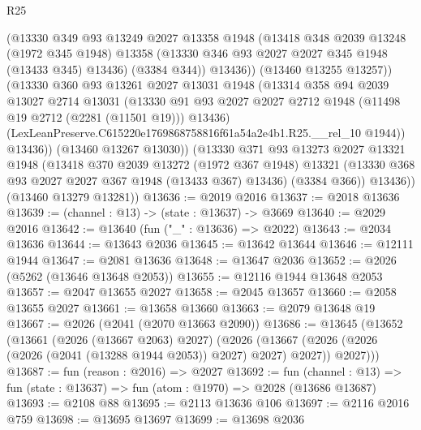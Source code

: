 \begin{lexlean}{R25}
\begin{coremodule}
                (@13330
                  @349
                  @93
                  @13249
                  @2027
                  @13358
                  @1948
                  (@13418
                    @348
                    @2039
                    @13248
                    (@1972 @345 @1948)
                    @13358
                    (@13330 @346 @93 @2027 @2027 @345 @1948 (@13433 @345) @13436)
                    (@3384 @344))
                  @13436))
              (@13460 @13255 @13257))
            (@13330
              @360
              @93
              @13261
              @2027
              @13031
              @1948
              (@13314
                @358
                @94
                @2039
                @13027
                @2714
                @13031
                (@13330
                  @91
                  @93
                  @2027
                  @2027
                  @2712
                  @1948
                  (@11498 @19 @2712 (@2281 (@11501 @19)))
                  @13436)
                (LexLeanPreserve.C615220e1769868758816f61a54a2e4b1.R25.__rel_10 @1944))
              @13436))
          (@13460 @13267 @13030))
        (@13330
          @371
          @93
          @13273
          @2027
          @13321
          @1948
          (@13418
            @370
            @2039
            @13272
            (@1972 @367 @1948)
            @13321
            (@13330 @368 @93 @2027 @2027 @367 @1948 (@13433 @367) @13436)
            (@3384 @366))
          @13436))
      (@13460 @13279 @13281))
@13636 := @2019 @2016
@13637 := @2018 @13636
@13639 := (channel : @13) -> (state : @13637) -> @3669
@13640 := @2029 @2016
@13642 := @13640 (fun ("_" : @13636) => @2022)
@13643 := @2034 @13636
@13644 := @13643 @2036
@13645 := @13642 @13644
@13646 := @12111 @1944
@13647 := @2081 @13636
@13648 := @13647 @2036
@13652 := @2026 (@5262 (@13646 @13648 @2053))
@13655 := @12116 @1944 @13648 @2053
@13657 := @2047 @13655 @2027
@13658 := @2045 @13657
@13660 := @2058 @13655 @2027
@13661 := @13658 @13660
@13663 := @2079 @13648 @19
@13667 := @2026 (@2041 (@2070 @13663 @2090))
@13686 := @13645
    (@13652
      (@13661
        (@2026 (@13667 @2063) @2027)
        (@2026
          (@13667 (@2026 (@2026 (@2026 (@2041 (@13288 @1944 @2053)) @2027) @2027) @2027))
          @2027)))
@13687 := fun (reason : @2016) => @2027
@13692 := fun (channel : @13) => fun (state : @13637) => fun (atom : @1970) => @2028 (@13686 @13687)
@13693 := @2108 @88
@13695 := @2113 @13636 @106
@13697 := @2116 @2016 @759
@13698 := @13695 @13697
@13699 := @13698 @2036

\end{coremodule}
\end{lexlean}
